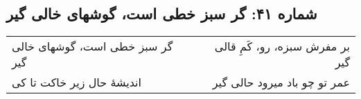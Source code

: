 \begin{center}
\section*{شماره ۴۱: گر سبز خطی است، گوشهای خالی گیر}
\label{sec:041}
\begin{longtable}{l p{0.5cm} r}
گر سبز خطی است، گوشهای خالی گیر
&&
بر مفرش سبزه، رو، کَمِ قالی گیر
\\
اندیشهٔ حال زیر خاکت تا کی
&&
عمر تو چو باد میرود حالی گیر
\\
\end{longtable}
\end{center}
